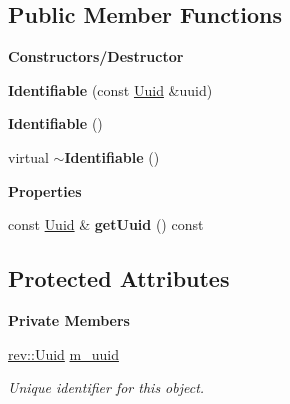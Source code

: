 \subsection*{Public Member Functions}
\begin{Indent}\textbf{ Constructors/\+Destructor}\par
\begin{DoxyCompactItemize}
\item 
\mbox{\label{classrev_1_1_identifiable_a238bf8d5c16d555cf6896cbfc22044b8}} 
{\bfseries Identifiable} (const \mbox{\hyperlink{classrev_1_1_uuid}{Uuid}} \&uuid)
\item 
\mbox{\label{classrev_1_1_identifiable_aaf6b20d0b79580fb510516b0c41a66b5}} 
{\bfseries Identifiable} ()
\item 
\mbox{\label{classrev_1_1_identifiable_af7b5a33fa276bc6941c743e23103e5d7}} 
virtual {\bfseries $\sim$\+Identifiable} ()
\end{DoxyCompactItemize}
\end{Indent}
\begin{Indent}\textbf{ Properties}\par
\begin{DoxyCompactItemize}
\item 
\mbox{\label{classrev_1_1_identifiable_a99e15b9610e46829a2ac455491374941}} 
const \mbox{\hyperlink{classrev_1_1_uuid}{Uuid}} \& {\bfseries get\+Uuid} () const
\end{DoxyCompactItemize}
\end{Indent}
\subsection*{Protected Attributes}
\begin{Indent}\textbf{ Private Members}\par
\begin{DoxyCompactItemize}
\item 
\mbox{\label{classrev_1_1_identifiable_ae1f3965b0a5d204f294fd9bf64848168}} 
\mbox{\hyperlink{classrev_1_1_uuid}{rev\+::\+Uuid}} \mbox{\hyperlink{classrev_1_1_identifiable_ae1f3965b0a5d204f294fd9bf64848168}{m\+\_\+uuid}}
\begin{DoxyCompactList}\small\item\em Unique identifier for this object. \end{DoxyCompactList}\end{DoxyCompactItemize}
\end{Indent}


